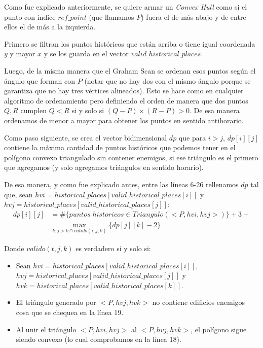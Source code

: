 Como fue explicado anteriormente, se quiere armar un \textit{Convex Hull} como si el punto con índice $ref\_point$
(que llamamos $P$) fuera el de más abajo y de entre ellos el de más a la izquierda.

Primero se filtran los puntos históricos que están arriba o tiene igual coordenada $y$ y mayor $x$ y se los guarda en 
el vector $valid\_historical\_places$.

Luego, de la misma manera que el Graham Scan se ordenan esos puntos según el ángulo que forman con $P$ (notar que no
hay dos con el mismo ángulo porque se garantiza que no hay tres vértices alineados). Esto se hace como en cualquier
algoritmo de ordenamiento pero definiendo el orden de manera que dos puntos $Q, R$ cumplen $Q < R$ si y solo si
$(Q-P) \times (R-P) > 0$. De esa manera ordenamos de menor a mayor para obtener los puntos en sentido antihorario.

Como paso siguiente, se crea el vector bidimensional $dp$ que para $i > j$, $dp[i][j]$ contiene la máxima cantidad de 
puntos históricos que podemos tener en el polígono convexo triangulado sin contener enemigos, si
ese triángulo es el primero que agregamos (y solo agregamos triángulos en sentido horario).

De esa manera, y como fue explicado antes, entre las líneas 6-26 rellenamos $dp$ tal que, sean 
$hvi = historical\_places[valid\_historical\_places[i]]$ y $hvj = historical\_places[valid\_historical\_places[j]]$:
\begin{equation*}
\begin{split}
    dp[i][j] & = \#\{ puntos\;historicos \in Triangulo(<P, hvi, hvj>)\} + 3 + \\
    & \max_{ k : j > k \cap valido(i,j,k) } \{dp[j][k]-2\}
\end{split}
\end{equation*}

Donde $valido(t,j,k)$ es verdadero si y solo si:
\begin{itemize}
\item Sean $hvi = historical\_places[valid\_historical\_places[i]]$, $hvj = historical\_places[valid\_historical\_places[j]]$ y
$hvk = historical\_places[valid\_historical\_places[k]]$.
\item El triángulo generado por $<P, hvj, hvk>$ no contiene edificios enemigos cosa que se chequea en la línea 19.
\item Al unir el triángulo $<P, hvi, hvj>$ al $<P, hvj, hvk>$, el polígono sigue siendo convexo (lo cual comprobamos en la línea 18).
\end{itemize}

